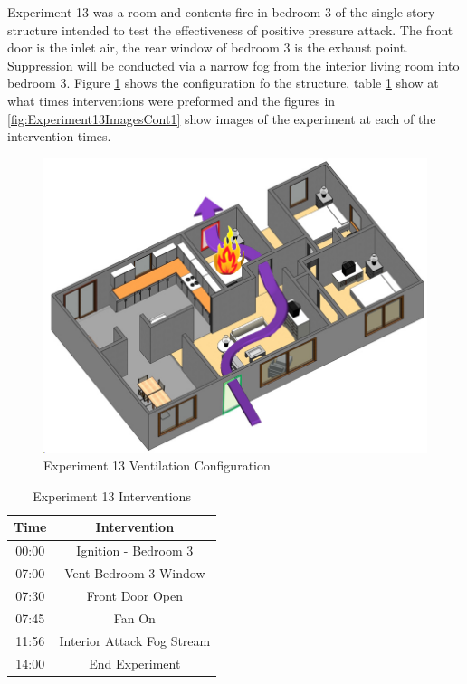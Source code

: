 \documentclass{article}
\begin{document}
Experiment 13 was a room and contents fire in bedroom 3 of the single story structure intended to test the effectiveness of positive pressure attack. The front door is the inlet air, the rear window of bedroom 3 is the exhaust point. Suppression will be conducted via a narrow fog from the interior living room into bedroom 3. Figure \ref{fig:Exp13VentConfig} shows the configuration fo the structure, table \ref{Table:Exp13Interventions} show at what times interventions were preformed and the figures in \ref{fig:Experiment13ImagesCont1} show images of the experiment at each of the intervention times.

\begin{figure}[h!]
	\centering
	\includegraphics[width=5in]{0_Images/FireExperiments/Single_Story/Experiment_13.jpg}
	\caption{Experiment 13 Ventilation Configuration}
	\label{fig:Exp13VentConfig}
\end{figure}

\begin{table}[H]
	\centering
	\caption{Experiment 13 Interventions}
	\begin{tabular}{|c|c|} 
		\hline
		Time & Intervention \\ \hline \hline
		00:00 & Ignition - Bedroom 3\\ \hline
		07:00 & Vent Bedroom 3 Window \\ \hline
		07:30 & Front Door Open \\ \hline
		07:45 & Fan On \\ \hline
		11:56 & Interior Attack Fog Stream \\ \hline
		14:00 & End Experiment \\ \hline
	\end{tabular}
	\label{Table:Exp13Interventions}
\end{table}
\end{document}
